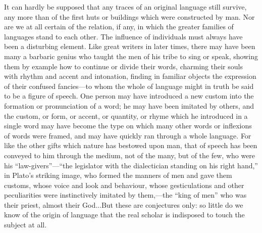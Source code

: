 \documentclass[11pt,letter]{article}
\begin{document}
\par  It can hardly be supposed that any traces of an original language still survive, any more than of the first huts or buildings which were constructed by man. Nor are we at all certain of the relation, if any, in which the greater families of languages stand to each other. The influence of individuals must always have been a disturbing element. Like great writers in later times, there may have been many a barbaric genius who taught the men of his tribe to sing or speak, showing them by example how to continue or divide their words, charming their souls with rhythm and accent and intonation, finding in familiar objects the expression of their confused fancies—to whom the whole of language might in truth be said to be a figure of speech. One person may have introduced a new custom into the formation or pronunciation of a word; he may have been imitated by others, and the custom, or form, or accent, or quantity, or rhyme which he introduced in a single word may have become the type on which many other words or inflexions of words were framed, and may have quickly ran through a whole language. For like the other gifts which nature has bestowed upon man, that of speech has been conveyed to him through the medium, not of the many, but of the few, who were his “law-givers”—“the legislator with the dialectician standing on his right hand,” in Plato’s striking image, who formed the manners of men and gave them customs, whose voice and look and behaviour, whose gesticulations and other peculiarities were instinctively imitated by them,—the “king of men” who was their priest, almost their God...But these are conjectures only: so little do we know of the origin of language that the real scholar is indisposed to touch the subject at all.
\end{document}

